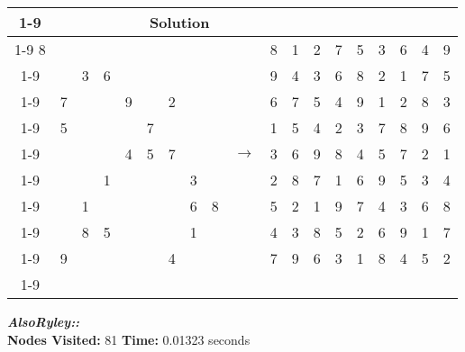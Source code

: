 \documentclass{article}
\begin{document}
\begin{tabular}{||c|c|c||c|c|c||c|c|c|| c ||c|c|c||c|c|c||c|c|c||}
  \cmidrule{1-9} \cmidrule{11-19}
  \multicolumn{9}{|c|}{Problem} &                   & \multicolumn{9}{|c|}{Solution}   \\\cmidrule{1-9} \cmidrule{11-19} \morecmidrules \cmidrule{1-9} \cmidrule{11-19}
8 &   &   &   &   &   &   &   &   &  & 8 & 1 & 2 & 7 & 5 & 3 & 6 & 4 & 9\\\cmidrule{1-9} \cmidrule{11-19}
  &   & 3 & 6 &   &   &   &   &   &  & 9 & 4 & 3 & 6 & 8 & 2 & 1 & 7 & 5\\\cmidrule{1-9} \cmidrule{11-19}
  & 7 &   &   & 9 &   & 2 &   &   &  & 6 & 7 & 5 & 4 & 9 & 1 & 2 & 8 & 3\\\cmidrule{1-9} \cmidrule{11-19} \morecmidrules \cmidrule{1-9} \cmidrule{11-19}
  & 5 &   &   &   & 7 &   &   &   &  & 1 & 5 & 4 & 2 & 3 & 7 & 8 & 9 & 6\\\cmidrule{1-9} \cmidrule{11-19}
  &   &   &   & 4 & 5 & 7 &   &   & $\rightarrow$ & 3 & 6 & 9 & 8 & 4 & 5 & 7 & 2 & 1\\\cmidrule{1-9} \cmidrule{11-19}
  &   &   & 1 &   &   &   & 3 &   &  & 2 & 8 & 7 & 1 & 6 & 9 & 5 & 3 & 4\\\cmidrule{1-9} \cmidrule{11-19} \morecmidrules \cmidrule{1-9} \cmidrule{11-19}
  &   & 1 &   &   &   &   & 6 & 8 &  & 5 & 2 & 1 & 9 & 7 & 4 & 3 & 6 & 8\\\cmidrule{1-9} \cmidrule{11-19}
  &   & 8 & 5 &   &   &   & 1 &   &  & 4 & 3 & 8 & 5 & 2 & 6 & 9 & 1 & 7\\\cmidrule{1-9} \cmidrule{11-19}
  & 9 &   &   &   &   & 4 &   &   &  & 7 & 9 & 6 & 3 & 1 & 8 & 4 & 5 & 2\\\cmidrule{1-9} \cmidrule{11-19} \morecmidrules \cmidrule{1-9} \cmidrule{11-19}
\end{tabular}
\newpage
\small\emph{\textbf{AlsoRyley::}}\\ \textbf{Nodes Visited:} 81 \textbf{Time:} 0.01323 seconds\\
\end{document}
